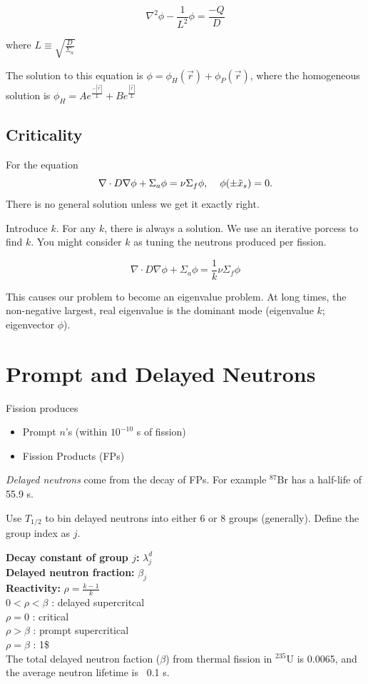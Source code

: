 \documentclass{report}
\newcommand{\tab}{\-\hspace{1cm}}
\newcommand{\h}[1]{\section*{#1}}
\newcommand{\hh}[1]{\subsection*{#1}}
\newcommand{\Xs}{\Sigma}
\newcommand{\pos}{\vec{r}}
\newcommand{\halflife}{T_{1/2}}
\newcommand{\ufive}{^{235}\text{U}}
\begin{document}
$$\nabla^2 \phi - \frac{1}{L^2}\phi = \frac{-Q}{D}$$

where $L \equiv \sqrt{\frac{D}{\Xs_a}}$

The solution to this equation is $\phi = \phi_H(\pos) + \phi_P(\pos)$, where the homogeneous solution is $\phi_H = Ae^{\frac{-|\pos|}{L}} + Be^{\frac{|\pos|}{L}}$


\hh{Criticality}

For the equation
$$\nabla \cdot D \nabla \phi + \Xs_a \phi = \nu\Xs_f \phi, \; \hspace{0.3cm}\phi(\pm\tilde{x}_s) = 0.$$
There is no general solution unless we get it exactly right.

Introduce $k$. For any $k$, there is always a solution. We use an iterative porcess to find $k$. You might consider $k$ as tuning the neutrons produced per fission.

$$\nabla \cdot D \nabla \phi + \Xs_a \phi = \frac{1}{k}\nu\Xs_f \phi$$

This causes our problem to become an eigenvalue problem. At long times, the non-negative largest, real eigenvalue is the dominant mode (eigenvalue $k$; eigenvector $\phi$).

\h{Prompt and Delayed Neutrons}

Fission produces
\begin{itemize}
    \item Prompt $n$'s (within $10^{-10}$ s of fission)
    \item Fission Products (FPs)
\end{itemize}

\textit{Delayed neutrons} come from the decay of FPs. For example $^{87}\text{Br}$ has a half-life of 55.9 s.

Use $\halflife$ to bin delayed neutrons into either 6 or 8 groups (generally). Define the group index as $j$.

\textbf{Decay constant of group $j$: } $\lambda_j^d$ \\
\textbf{Delayed neutron fraction: } $\beta_j$\\
\textbf{Reactivity: } $\rho = \frac{k-1}{k}$\\
    \tab $0<\rho<\beta$ : delayed supercritcal\\
    \tab $\rho=0$ : critical\\
    \tab $\rho>\beta$ : prompt supercritical\\
    \tab $\rho=\beta$ : 1\$\\

The total delayed neutron faction ($\beta$) from thermal fission in $\ufive$ is 0.0065, and the average neutron lifetime is ~0.1 s.
\end{document}
